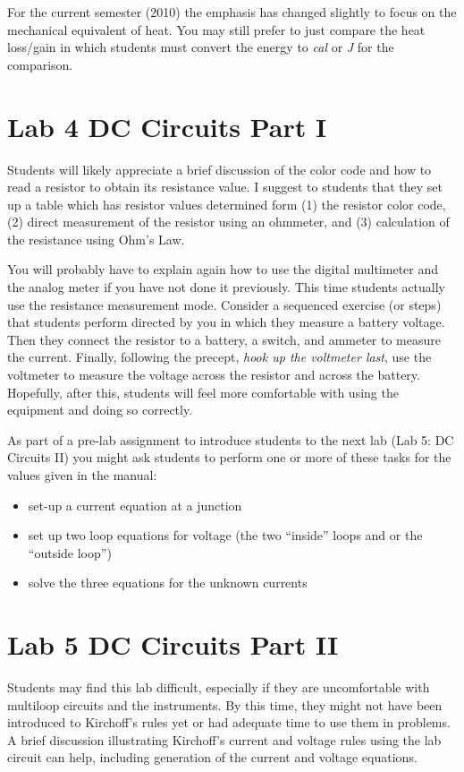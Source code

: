 For the current semester (2010) the emphasis has changed slightly to focus on the mechanical equivalent of heat. You may still prefer to just compare the heat loss/gain in which students must convert the energy to \textsl{cal} or \textsl {J} for the comparison.

\section{Lab 4 DC Circuits Part I}
Students will likely appreciate a brief discussion of the color code and how to read a resistor to obtain its resistance value. I suggest to students that they set up a table which has resistor values determined form (1) the resistor color code, (2) direct measurement of the resistor using an ohmmeter, and (3) calculation of the resistance using Ohm's Law.

You will probably have to explain again how to use the digital multimeter and the analog meter if you have not done it previously. This time students actually use the resistance measurement mode. Consider a sequenced exercise (or steps) that students perform directed by you in which they measure a battery voltage. Then they connect the resistor to a battery, a switch, and ammeter to measure the current. Finally, following the precept,\textsl{ hook up the voltmeter last}, use the voltmeter to measure the voltage across the resistor and across the battery. Hopefully, after this, students will feel more comfortable with using the equipment and doing so correctly.

As part of a pre-lab assignment to introduce students to the next lab (Lab 5: DC Circuits II) you might ask students to perform one or more of these tasks for the values given in the manual:
\begin{itemize}
	\item set-up a current equation at a junction
	\item set up two loop equations for voltage (the two ``inside'' loops and or the ``outside loop'') 
	\item solve the three equations for the unknown currents
\end{itemize}

\section{Lab 5 DC Circuits Part II}
Students may find this lab difficult, especially if they are uncomfortable with multiloop circuits and the instruments. By this time, they might not have been introduced to Kirchoff's rules yet or had adequate time to use them in problems. A brief discussion illustrating Kirchoff's current and voltage rules using the lab circuit can help, including generation of the current and voltage equations.

